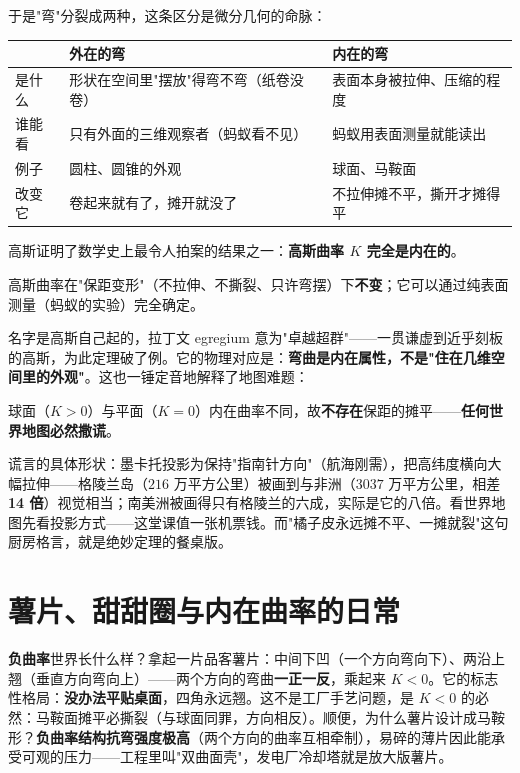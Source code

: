 于是"弯"分裂成两种，这条区分是微分几何的命脉：

\begin{center}
\begin{tabular}{lp{}p{}}
\toprule
 & 外在的弯 & 内在的弯 \\
\midrule
是什么 & 形状在空间里"摆放"得弯不弯（纸卷没卷） & 表面本身被拉伸、压缩的程度 \\
谁能看 & 只有外面的三维观察者（蚂蚁看不见） & 蚂蚁用表面测量就能读出 \\
例子 & 圆柱、圆锥的外观 & 球面、马鞍面 \\
改变它 & 卷起来就有了，摊开就没了 & 不拉伸摊不平，撕开才摊得平 \\
\bottomrule
\end{tabular}
\end{center}

高斯证明了数学史上最令人拍案的结果之一：\textbf{高斯曲率 $K$ 完全是内在的}。

\begin{dingli}
高斯曲率在"保距变形"（不拉伸、不撕裂、只许弯摆）下\textbf{不变}；它可以通过纯表面测量（蚂蚁的实验）完全确定。
\end{dingli}

名字是高斯自己起的，拉丁文 egregium 意为"卓越超群"——一贯谦虚到近乎刻板的高斯，为此定理破了例。它的物理对应是：\textbf{弯曲是内在属性，不是"住在几维空间里的外观"}。这也一锤定音地解释了地图难题：

\begin{jielun}
球面（$K>0$）与平面（$K=0$）内在曲率不同，故\textbf{不存在}保距的摊平——\textbf{任何世界地图必然撒谎}。
\end{jielun}

谎言的具体形状：墨卡托投影为保持"指南针方向"（航海刚需），把高纬度横向大幅拉伸——格陵兰岛（$216$ 万平方公里）被画到与非洲（$3037$ 万平方公里，相差 \textbf{14 倍}）视觉相当；南美洲被画得只有格陵兰的六成，实际是它的八倍。看世界地图先看投影方式——这堂课值一张机票钱。而"橘子皮永远摊不平、一摊就裂"这句厨房格言，就是绝妙定理的餐桌版。

\section{薯片、甜甜圈与内在曲率的日常}

\textbf{负曲率}世界长什么样？拿起一片品客薯片：中间下凹（一个方向弯向下）、两沿上翘（垂直方向弯向上）——两个方向的弯曲\textbf{一正一反}，乘起来 $K < 0$。它的标志性格局：\textbf{没办法平贴桌面}，四角永远翘。这不是工厂手艺问题，是 $K<0$ 的必然：马鞍面摊平必撕裂（与球面同罪，方向相反）。顺便，为什么薯片设计成马鞍形？\textbf{负曲率结构抗弯强度极高}（两个方向的曲率互相牵制），易碎的薄片因此能承受可观的压力——工程里叫"双曲面壳"，发电厂冷却塔就是放大版薯片。

